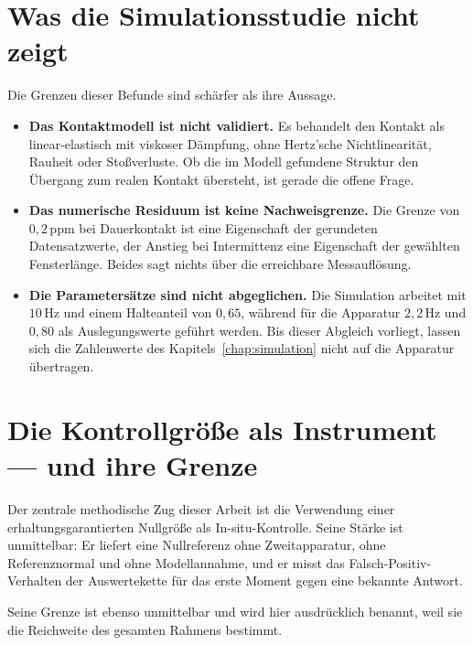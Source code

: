 \documentclass[12pt,a4paper]{report}
\begin{document}
\section{Was die Simulationsstudie nicht zeigt}

Die Grenzen dieser Befunde sind schärfer als ihre Aussage.

\begin{itemize}
\item \textbf{Das Kontaktmodell ist nicht validiert.} Es behandelt den
      Kontakt als linear-elastisch mit viskoser Dämpfung, ohne
      Hertz'sche Nichtlinearität, Rauheit oder Stoßverluste. Ob die im
      Modell gefundene Struktur den Übergang zum realen Kontakt
      übersteht, ist gerade die offene Frage.
\item \textbf{Das numerische Residuum ist keine Nachweisgrenze.} Die
      Grenze von $0{,}2\,\mathrm{ppm}$ bei Dauerkontakt ist eine
      Eigenschaft der gerundeten Datensatzwerte, der Anstieg bei Intermittenz eine
      Eigenschaft der gewählten Fensterlänge. Beides sagt nichts über
      die erreichbare Messauflösung.
\item \textbf{Die Parametersätze sind nicht abgeglichen.} Die Simulation
      arbeitet mit $10\,\mathrm{Hz}$ und einem Halteanteil von $0{,}65$,
      während für die Apparatur $2{,}2\,\mathrm{Hz}$ und $0{,}80$ als
      Auslegungswerte geführt werden. Bis dieser Abgleich vorliegt,
      lassen sich die Zahlenwerte des Kapitels~\ref{chap:simulation}
      nicht auf die Apparatur übertragen.
\end{itemize}

\section{Die Kontrollgröße als Instrument --- und ihre Grenze}
\label{sec:kontrollgrenze}

Der zentrale methodische Zug dieser Arbeit ist die Verwendung einer
erhaltungsgarantierten Nullgröße als In-situ-Kontrolle. Seine Stärke ist
unmittelbar: Er liefert eine Nullreferenz ohne Zweitapparatur, ohne
Referenznormal und ohne Modellannahme, und er misst das
Falsch-Positiv-Verhalten der Auswertekette für das erste Moment gegen
eine bekannte Antwort.

Seine Grenze ist ebenso unmittelbar und wird hier ausdrücklich benannt,
weil sie die Reichweite des gesamten Rahmens bestimmt.

\vspace{0.5em}
\end{document}
